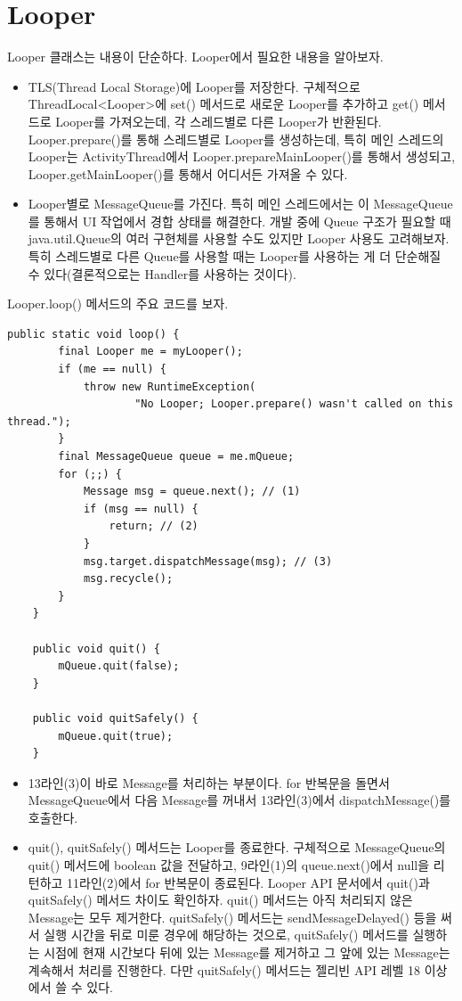 \section{Looper}
Looper 클래스는 내용이 단순하다. Looper에서 필요한 내용을 알아보자.
\begin{itemize}
\item TLS(Thread Local Storage)에 Looper를 저장한다. 
구체적으로 ThreadLocal<Looper>에 set() 메서드로 새로운 Looper를 추가하고 get() 메서드로 Looper를 가져오는데, 각 스레드별로 다른 Looper가 반환된다.
Looper.prepare()를 통해 스레드별로 Looper를 생성하는데, 특히 메인 스레드의 Looper는 ActivityThread에서 Looper.prepareMainLooper()를 통해서 생성되고, Looper.getMainLooper()를 통해서 어디서든 가져올 수 있다.

\item Looper별로 MessageQueue를 가진다. 
특히 메인 스레드에서는 이 MessageQueue를 통해서 UI 작업에서 경합 상태를 해결한다. 
개발 중에 Queue 구조가 필요할 때 java.util.Queue의 여러 구현체를 사용할 수도 있지만 Looper 사용도 고려해보자. 
특히 스레드별로 다른 Queue를 사용할 때는 Looper를 사용하는 게 더 단순해질 수 있다(결론적으로는 Handler를 사용하는 것이다).
\end{itemize}

Looper.loop() 메서드의 주요 코드를 보자.
\begin{lstlisting}[frame=single, caption=Looper.java] 
	public static void loop() {
		final Looper me = myLooper();
		if (me == null) {
			throw new RuntimeException(
					"No Looper; Looper.prepare() wasn't called on this thread.");
		}
		final MessageQueue queue = me.mQueue;
		for (;;) {
			Message msg = queue.next(); // (1)
			if (msg == null) {
				return; // (2)
			}
			msg.target.dispatchMessage(msg); // (3)
			msg.recycle();
		}
	}
	
	public void quit() {
        mQueue.quit(false);
    }
    
    public void quitSafely() {
        mQueue.quit(true);
    }
\end{lstlisting}	
\begin{itemize}
\item 13라인(3)이 바로 Message를 처리하는 부분이다. 
for 반복문을 돌면서 MessageQueue에서 다음 Message를 꺼내서 13라인(3)에서 dispatchMessage()를 호출한다. 

\item quit(), quitSafely() 메서드는 Looper를 종료한다. 
구체적으로 MessageQueue의 quit() 메서드에 boolean 값을 전달하고, 9라인(1)의 queue.next()에서 null을 리턴하고 11라인(2)에서 for 반복문이 종료된다.
Looper API 문서에서 quit()과 quitSafely() 메서드 차이도 확인하자.
quit() 메서드는 아직 처리되지 않은 Message는 모두 제거한다.
quitSafely() 메서드는 sendMessageDelayed() 등을 써서 실행 시간을 뒤로 미룬 경우에 해당하는 것으로, quitSafely() 메서드를 실행하는 시점에 현재 시간보다 뒤에 있는 Message를 제거하고 그 앞에 있는 Message는 계속해서 처리를 진행한다. 다만 quitSafely() 메서드는 젤리빈 API 레벨 18 이상에서 쓸 수 있다.
\end{itemize}

